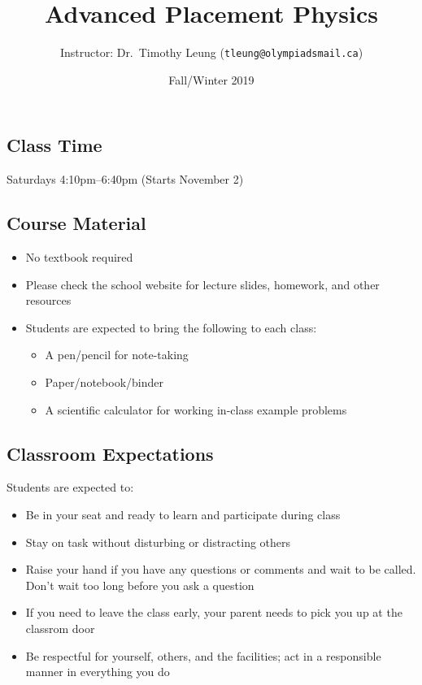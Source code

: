 \documentclass[11pt]{article}
\title{\vspace{-.2in}\textbf{Advanced Placement Physics}}
\author{Instructor: Dr.\ Timothy Leung (\texttt{tleung@olympiadsmail.ca})}
\date{Fall/Winter 2019}
\begin{document}
\maketitle

\subsection{Class Time}
Saturdays 4:10pm--6:40pm (Starts November 2)




\subsection{Course Material}
\begin{itemize}[itemsep=0pt,leftmargin=12pt]
\item No textbook required
\item Please check the school website for lecture slides, homework, and other
  resources
\item Students are expected to bring the following to each class:
  \begin{itemize}[noitemsep,topsep=0pt]
  \item A pen/pencil for note-taking
  \item Paper/notebook/binder
  \item A scientific calculator for working in-class example problems
  \end{itemize}
\end{itemize}




\subsection{Classroom Expectations}
Students are expected to:
\begin{itemize}[itemsep=0pt,leftmargin=12pt]
\item Be in your seat and ready to learn and participate during class
\item Stay on task without disturbing or distracting others
\item Raise your hand if you have any questions or comments and wait to be
  called. Don't wait too long before you ask a question
\item If you need to leave the class early, your parent needs to pick you up at
  the classrom door
\item Be respectful for yourself, others, and the facilities; act in
  a responsible manner in everything you do
\end{itemize}
\end{document}
